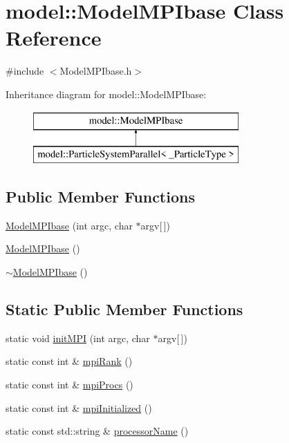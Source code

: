 \hypertarget{classmodel_1_1_model_m_p_ibase}{}\section{model\+:\+:Model\+M\+P\+Ibase Class Reference}
\label{classmodel_1_1_model_m_p_ibase}


{\ttfamily \#include $<$Model\+M\+P\+Ibase.\+h$>$}

Inheritance diagram for model\+:\+:Model\+M\+P\+Ibase\+:\begin{figure}[H]
\begin{center}
\leavevmode
\includegraphics[height=2.000000cm]{classmodel_1_1_model_m_p_ibase}
\end{center}
\end{figure}
\subsection*{Public Member Functions}
\begin{DoxyCompactItemize}
\item 
\hyperlink{classmodel_1_1_model_m_p_ibase_abb021774a6f00c803658f5c8c09aaa95}{Model\+M\+P\+Ibase} (int argc, char $\ast$argv\mbox{[}$\,$\mbox{]})
\item 
\hyperlink{classmodel_1_1_model_m_p_ibase_a563ea663a3f97ca037fa98115b93fb20}{Model\+M\+P\+Ibase} ()
\item 
\hyperlink{classmodel_1_1_model_m_p_ibase_a7c79ec1ec4fc3bed4649f6f377ab4491}{$\sim$\+Model\+M\+P\+Ibase} ()
\end{DoxyCompactItemize}
\subsection*{Static Public Member Functions}
\begin{DoxyCompactItemize}
\item 
static void \hyperlink{classmodel_1_1_model_m_p_ibase_a115e992fca06259e9143c8cb1a5864de}{init\+M\+P\+I} (int argc, char $\ast$argv\mbox{[}$\,$\mbox{]})
\item 
static const int \& \hyperlink{classmodel_1_1_model_m_p_ibase_afb1b70f1d2147baeb9e778486e1926fc}{mpi\+Rank} ()
\item 
static const int \& \hyperlink{classmodel_1_1_model_m_p_ibase_a8416bcdc88dbd95cd91e1e7fa51f10af}{mpi\+Procs} ()
\item 
static const int \& \hyperlink{classmodel_1_1_model_m_p_ibase_a89a632938adf9783c4809d58caa7c1e5}{mpi\+Initialized} ()
\item 
static const std\+::string \& \hyperlink{classmodel_1_1_model_m_p_ibase_aaa728dcba52d193e957dae8102606389}{processor\+Name} ()
\end{DoxyCompactItemize}


